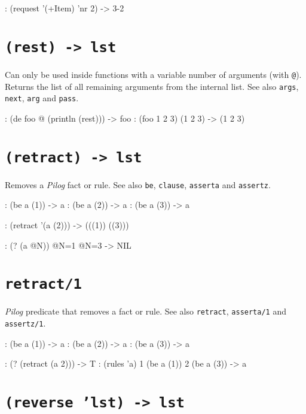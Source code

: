 \begin{wideverbatim}
: (request '(+Item) 'nr 2)
-> {3-2}
\end{wideverbatim}

 
\section*{\texttt{(rest) -> lst}}
\label{sec:func-ref-R-(rest) -> lst}


Can only be used inside functions with a variable number of arguments
(with \texttt{@}). Returns the list of all remaining arguments from the
internal list. See also \texttt{args}, \texttt{next}, \texttt{arg} and \texttt{pass}.


\begin{wideverbatim}
: (de foo @ (println (rest)))
-> foo
: (foo 1 2 3)
(1 2 3)
-> (1 2 3)
\end{wideverbatim}


\section*{\texttt{(retract) -> lst}}

Removes a \emph{Pilog} fact or rule. See also \texttt{be},
\texttt{clause}, \texttt{asserta} and \texttt{assertz}.

\begin{wideverbatim}
: (be a (1))
-> a
: (be a (2))
-> a
: (be a (3))
-> a

: (retract '(a (2)))
-> (((1)) ((3)))

:  (? (a @N))
 @N=1
 @N=3
-> NIL
\end{wideverbatim}

 
\section*{\texttt{retract/1}}
\label{sec:func-ref-R-(retract) -> lst}


\emph{Pilog} predicate that removes a fact or rule. See
also \texttt{retract}, \texttt{asserta/1} and \texttt{assertz/1}.


\begin{wideverbatim}
: (be a (1))
-> a
: (be a (2))
-> a
: (be a (3))
-> a

: (? (retract (a 2)))
-> T
: (rules 'a)
1 (be a (1))
2 (be a (3))
-> a
\end{wideverbatim}

 
\section*{\texttt{(reverse 'lst) -> lst}}
\label{sec:func-ref-R-(reverse 'lst) -> lst}


